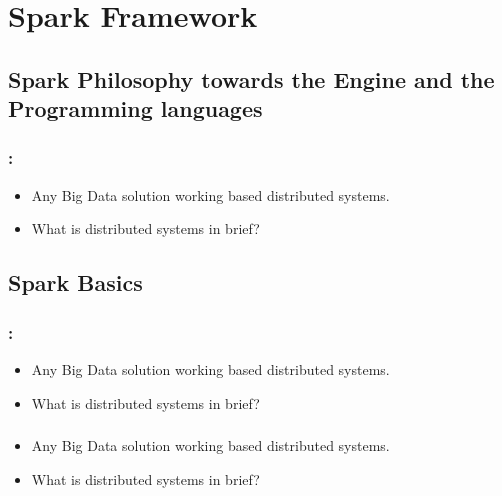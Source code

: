 \section{Spark Framework}

\subsection{Spark Philosophy towards the Engine and the Programming languages}

\begin{frame}
\frametitle{\secname : \subsecname}
\begin{itemize}[<+->]
	\item Any Big Data solution working based distributed systems.
	\item What is distributed systems in brief?
\end{itemize}
\end{frame}



\subsection{Spark Basics}


\begin{frame}
  \frametitle{\secname : \subsecname}
	\begin{itemize}[<+->]
		\item Any Big Data solution working based distributed systems.
		\item What is distributed systems in brief?
	\end{itemize}
\end{frame}

\begin{frame}
  \frametitle{\subsecname}
	\begin{itemize}[<+->]
		\item Any Big Data solution working based distributed systems.
		\item What is distributed systems in brief?
	\end{itemize}
\end{frame}

